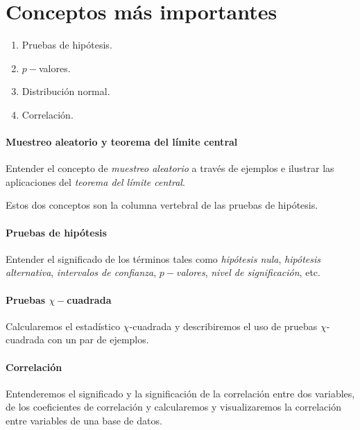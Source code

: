 \section{Conceptos más importantes}

\begin{enumerate}
\item Pruebas de hipótesis.
\item $p-$valores.
\item Distribución normal.
\item Correlación.
\end{enumerate}


\paragraph{Muestreo aleatorio y teorema del límite central}
Entender el concepto de \emph{muestreo aleatorio} a través de ejemplos e ilustrar las aplicaciones del \emph{teorema del límite central}. 

  Estos dos conceptos son la columna vertebral de las pruebas de hipótesis.


\paragraph{Pruebas de hipótesis}
Entender el significado de los términos tales como \emph{hipótesis nula}, \emph{hipótesis alternativa}, \emph{intervalos de confianza}, \emph{$p-$valores}, \emph{nivel de significación}, etc.

\paragraph{Pruebas $\chi-$cuadrada}
Calcularemos el estadístico $\chi$-cuadrada y describiremos el uso de pruebas $\chi$-cuadrada con un par de ejemplos.

 \paragraph{Correlación}
  Entenderemos el significado y la significación de la correlación entre dos variables, de los coeficientes de correlación y calcularemos y visualizaremos la correlación entre variables de una base de datos.
 
